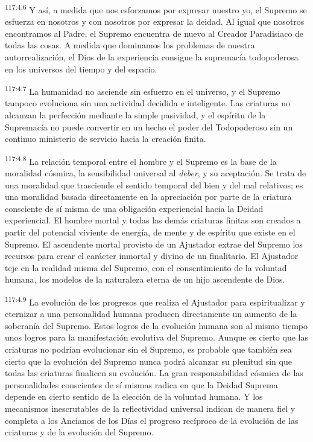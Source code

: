 \documentclass[twoside, 11pt]{book}
\begin{document}
\par
\textsuperscript{117:4.6} Y así, a medida que nos esforzamos por expresar nuestro yo, el Supremo se esfuerza en nosotros y con nosotros por expresar la deidad. Al igual que nosotros encontramos al Padre, el Supremo encuentra de nuevo al Creador Paradisiaco de todas las cosas. A medida que dominamos los problemas de nuestra autorrealización, el Dios de la experiencia consigue la supremacía todopoderosa en los universos del tiempo y del espacio.

\par
\textsuperscript{117:4.7} La humanidad no asciende sin esfuerzo en el universo, y el Supremo tampoco evoluciona sin una actividad decidida e inteligente. Las criaturas no alcanzan la perfección mediante la simple pasividad, y el espíritu de la Supremacía no puede convertir en un hecho el poder del Todopoderoso sin un continuo ministerio de servicio hacia la creación finita.

\par
\textsuperscript{117:4.8} La relación temporal entre el hombre y el Supremo es la base de la moralidad cósmica, la sensibilidad universal al \textit{deber}, y su aceptación. Se trata de una moralidad que trasciende el sentido temporal del bien y del mal relativos; es una moralidad basada directamente en la apreciación por parte de la criatura consciente de sí misma de una obligación experiencial hacia la Deidad experiencial. El hombre mortal y todas las demás criaturas finitas son creados a partir del potencial viviente de energía, de mente y de espíritu que existe en el Supremo. El ascendente mortal provisto de un Ajustador extrae del Supremo los recursos para crear el carácter inmortal y divino de un finalitario. El Ajustador teje en la realidad misma del Supremo, con el consentimiento de la voluntad humana, los modelos de la naturaleza eterna de un hijo ascendente de Dios.

\par
\textsuperscript{117:4.9} La evolución de los progresos que realiza el Ajustador para espiritualizar y eternizar a una personalidad humana producen directamente un aumento de la soberanía del Supremo. Estos logros de la evolución humana son al mismo tiempo unos logros para la manifestación evolutiva del Supremo. Aunque es cierto que las criaturas no podrían evolucionar sin el Supremo, es probable que también sea cierto que la evolución del Supremo nunca podrá alcanzar su plenitud sin que todas las criaturas finalicen su evolución. La gran responsabilidad cósmica de las personalidades conscientes de sí mismas radica en que la Deidad Suprema depende en cierto sentido de la elección de la voluntad humana. Y los mecanismos inescrutables de la reflectividad universal indican de manera fiel y completa a los Ancianos de los Días el progreso recíproco de la evolución de las criaturas y de la evolución del Supremo.
\end{document}
